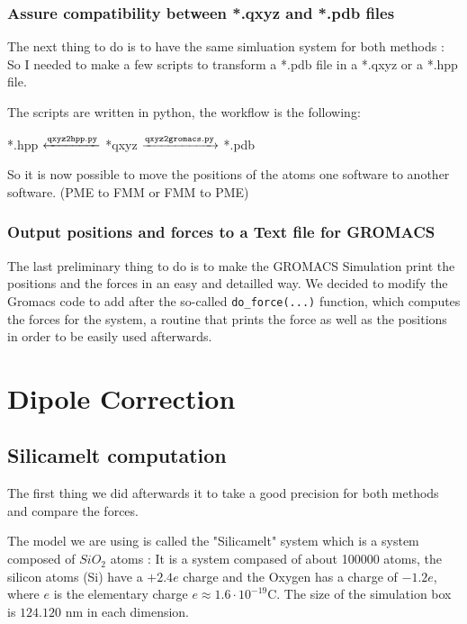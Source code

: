 \documentclass[11pt,twoside,a4paper]{report}
\begin{document}
\subsubsection{Assure compatibility between *.qxyz and *.pdb files}

The next thing to do is to have the same simluation system for both methods : So I needed to make a few scripts to transform a *.pdb file in a *.qxyz or a *.hpp file.

The scripts are written in python, the workflow is the following:

{
	\centering 
	{
	
	  *.hpp $\xleftarrow{\tt{qxyz2hpp.py}}$  *qxyz $\xrightarrow{\tt{qxyz2gromacs.py}}$ *.pdb	
	}
}

So it is now possible to move the positions of the atoms one software to another software. (PME to FMM or FMM to PME)

\subsubsection{Output positions and forces to a Text file for GROMACS}

The last preliminary thing to do is to make the GROMACS Simulation print the positions and the forces in an easy and detailled way. We decided to modify the Gromacs code to add after the so-called {\tt{do\_force(...)}} function, which computes the forces for the system, a routine that prints the force as well as the positions in order to be
 easily used afterwards. 

\section{Dipole Correction}

\subsection{Silicamelt computation}

The first thing we did afterwards it to take a good precision for both methods and compare the forces.


The model we are using is called the "Silicamelt" system which is a system composed of $SiO_2$ atoms : It is a system compased of about 100000 atoms, the silicon atoms (Si) have a $+2.4e$ charge and the Oxygen has a charge of $-1.2e$, where $e$ is the elementary charge $e \approx 1.6\cdot10^{-19} \text{C}$.
The size of the simulation box is $124.120$ nm in each dimension.
\end{document}
